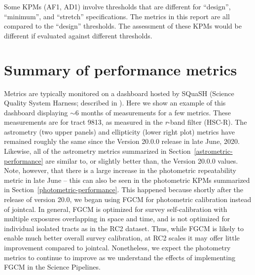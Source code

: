 \documentclass[DM,toc]{lsstdoc}
\begin{document}
Some KPMs (AF1, AD1) involve thresholds that are different for ``design'', ``minimum'', and ``stretch'' specifications. The metrics in this report are all compared to the ``design'' thresholds. The assessment of these KPMs would be different if evaluated against different thresholds.


\section{Summary of performance metrics}

Metrics are typically monitored on a dashboard hosted by SQuaSH (Science Quality System Harness; described in ). Here we show an example of this dashboard displaying $\sim6$ months of measurements for a few metrics. These measurements are for tract 9813, as measured in the \emph{r}-band filter (HSC-R). The astrometry (two upper panels) and ellipticity (lower right plot) metrics have remained roughly the same since the Version 20.0.0 release in late June, 2020. Likewise, all of the astrometry metrics summarized in Section~\ref{astrometric-performance} are similar to, or slightly better than, the Version 20.0.0 values. Note, however, that there is a large increase in the photometric repeatability metric in late June -- this can also be seen in the photometric KPMs summarized in Section~\ref{photometric-performance}. This happened because shortly after the release of version 20.0, we began using FGCM \citep{2018AJ....155...41B} for photometric calibration instead of jointcal. In general, FGCM is optimized for survey self-calibration with multiple exposures overlapping in space and time, and is not optimized for individual isolated tracts as in the RC2 dataset. Thus, while FGCM is likely to enable much better overall survey calibration, at RC2 scales it may offer little improvement compared to jointcal. Nonetheless, we expect the photometry metrics to continue to improve as we understand the effects of implementing FGCM in the Science Pipelines.
\end{document}
